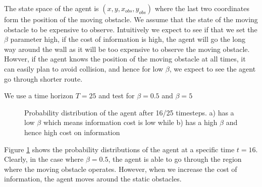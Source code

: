 The state space of the agent is $(x,y,x_{obs},y_{obs})$ where the last two coordinates form the position of the moving obstacle. We assume that the state of the moving obstacle to be expensive to observe. Intuitively we expect to see if that we set the $\beta$ parameter high, \ie if the cost of information is high, the agent will go the long way around the wall as it will be too expensive to observe the moving obstacle. Howver, if the agent knows the position of the moving obstacle at all times, it can easily plan to avoid collision, and hence for low $\beta$, we expect to see the agent go through shorter route. 

We use a time horizon $T = 25$ and test for $\beta = 0.5$ and $\beta=5$

\begin{figure}
	\caption{Probability distribution of the agent after 16/25 timesteps. a) has a low $\beta$ which means information cost is low while b) has a high $\beta$ and hence high cost on information}
	\label{fig:expres}
\end{figure}

Figure \ref{fig:expres} shows the probability distributions of the agent at a specific time $t=16$. Clearly, in the case where $\beta=0.5$, the agent is able to go through the region where the moving obstacle operates. However, when we increase the cost of information, the agent moves around the static obstacles.

